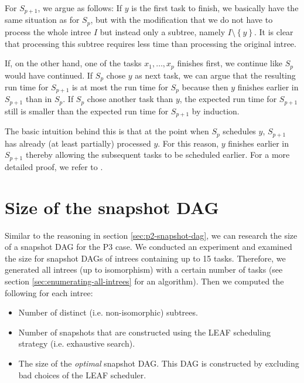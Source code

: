 
  
  For $S_{p+1}$, we argue as follows: If $y$ is the first task to finish, we basically have the same situation as for $S_p$, but with the modification that we do not have to process the whole intree $I$ but instead only a subtree, namely $I\setminus\left\{ y \right\}$. It is clear that processing this subtree requires less time than processing the original intree.

  If, on the other hand, one of the tasks $x_1,\dots,x_p$ finishes first, we continue like $S_p$ would have continued. If $S_p$ chose $y$ as next task, we can argue that the resulting run time for $S_{p+1}$ is at most the run time for $S_p$ because then $y$ finishes earlier in $S_{p+1}$ than in $S_p$. 
  If $S_p$ chose another task than $y$, the expected run time for $S_{p+1}$ still is smaller than the expected run time for $S_{p+1}$ by induction.

  The basic intuition behind this is that at the point when $S_p$ schedules $y$, $S_{p+1}$ has already (at least partially) processed $y$. For this reason, $y$ finishes earlier in $S_{p+1}$ thereby allowing the subsequent tasks to be scheduled earlier. For a more detailed proof, we refer to \cite{MoritzMaasDiploma}.

\section{Size of the snapshot DAG}
\label{sec:p3-size-of-snapshot-dag-first-attempts}

Similar to the reasoning in section \ref{sec:p2-snapshot-dag}, we can research the size of a snapshot DAG for the P3 case. 
We conducted an experiment and examined the size for snapshot DAGs of intrees containing up to 15 tasks. 
Therefore, we generated all intrees (up to isomorphism) with a certain number of tasks (see section \ref{sec:enumerating-all-intrees} for an algorithm).
Then we computed the following for each intree:
\begin{itemize}
\item Number of distinct (i.e. non-isomorphic) subtrees.
\item Number of snapshots that are constructed using the LEAF scheduling strategy (i.e. exhaustive search).
\item The size of the \emph{optimal} snapshot DAG. This DAG is constructed by excluding bad choices of the LEAF scheduler.
\end{itemize}

